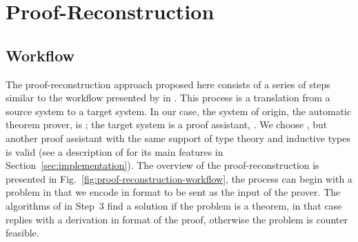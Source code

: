 \documentclass[../main.tex]{subfiles}
\begin{document}

\section{Proof-Reconstruction}
\label{sec:proof-reconstruction}

\subsection{Workflow}
\label{ssec:workflow}



The proof-reconstruction approach proposed here consists of a series
of steps similar to the workflow presented by \citeauthor{sultana2015} in
\cite{sultana2015}. This process is a translation from a source
system to a target system. In our case, the system of origin, the
automatic theorem prover, is \Metis; the target system is a proof
assistant, \Agda. We choose \Agda, but another proof assistant with the same support of type theory and inductive types is valid (see a description of \Agda for its main features in
Section~\ref{sec:implementation}).
The overview of the proof-reconstruction is presented in
Fig.~\ref{fig:proof-reconstruction-workflow}, the process can begin with
a problem in \CPL that we encode in \TPTP format to be sent as the
input of the \Metis prover.
The algorithms of \Metis in Step~3 find
a solution if the problem is a theorem, in that case \Metis replies
with a derivation in \TSTP format of the proof, otherwise the problem is counter feasible.



\end{document}
